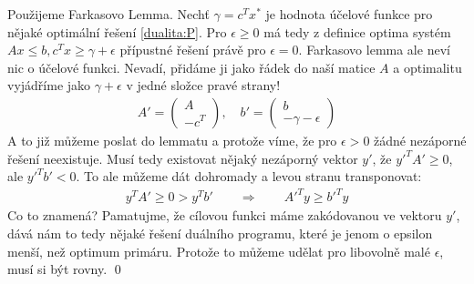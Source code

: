 \dk Použijeme Farkasovo Lemma. Nechť $\gamma = c^Tx^*$ je hodnota účelové funkce
pro nějaké optimální řešení \eqref{dualita:P}. Pro $\epsilon \geq 0$ má tedy z
definice optima systém $Ax \leq b, c^Tx \geq \gamma + \epsilon$ přípustné řešení právě pro
$\epsilon = 0$. Farkasovo lemma ale neví nic o účelové funkci. Nevadí, přidáme
ji jako řádek do naší matice $A$ a optimalitu vyjádříme jako $\gamma + \epsilon$
v jedné složce pravé strany!
\begin{align}
	A' = \left(\begin{array}{c} A \\ -c^T \end{array}\right), \quad b' =
	\left(\begin{array}{c} b \\ -\gamma - \epsilon\end{array}\right)
\end{align}
A to již můžeme poslat do lemmatu a protože víme, že pro $\epsilon > 0$ žádné
nezáporné řešení neexistuje. Musí tedy existovat nějaký nezáporný vektor $y'$, že
$y'^TA' \geq 0$, ale $y'^T b' < 0$. To ale můžeme dát dohromady a levou stranu
transponovat:
\begin{align}
	y^TA' \geq 0 > y^T b' \qquad \Rightarrow \qquad
	A'^Ty \geq b'^T y
\end{align}
Co to znamená? Pamatujme, že cílovou funkci máme zakódovanou ve vektoru
$y'$, dává nám to tedy nějaké řešení duálního programu, které je jenom o epsilon
menší, než optimum primáru. Protože to můžeme udělat pro libovolně malé
$\epsilon$, musí si být rovny.
\qed


